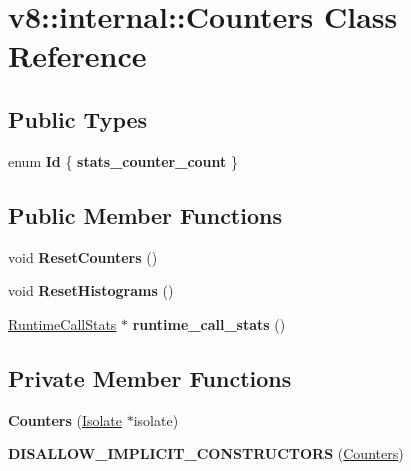 \hypertarget{classv8_1_1internal_1_1_counters}{}\section{v8\+:\+:internal\+:\+:Counters Class Reference}
\label{classv8_1_1internal_1_1_counters}
\subsection*{Public Types}
\begin{DoxyCompactItemize}
\item 
enum {\bfseries Id} \{ {\bfseries stats\+\_\+counter\+\_\+count}
 \}\hypertarget{classv8_1_1internal_1_1_counters_a77f5e90ac882f961ab168d691da5057c}{}\label{classv8_1_1internal_1_1_counters_a77f5e90ac882f961ab168d691da5057c}

\end{DoxyCompactItemize}
\subsection*{Public Member Functions}
\begin{DoxyCompactItemize}
\item 
void {\bfseries Reset\+Counters} ()\hypertarget{classv8_1_1internal_1_1_counters_acb6463bd09a4e95031ab7c601803403e}{}\label{classv8_1_1internal_1_1_counters_acb6463bd09a4e95031ab7c601803403e}

\item 
void {\bfseries Reset\+Histograms} ()\hypertarget{classv8_1_1internal_1_1_counters_ac8b9a827af33b6e3b284c9111b53b3f8}{}\label{classv8_1_1internal_1_1_counters_ac8b9a827af33b6e3b284c9111b53b3f8}

\item 
\hyperlink{structv8_1_1internal_1_1_runtime_call_stats}{Runtime\+Call\+Stats} $\ast$ {\bfseries runtime\+\_\+call\+\_\+stats} ()\hypertarget{classv8_1_1internal_1_1_counters_aa27049ebe05a1e1a0df0d0a03f679b9d}{}\label{classv8_1_1internal_1_1_counters_aa27049ebe05a1e1a0df0d0a03f679b9d}

\end{DoxyCompactItemize}
\subsection*{Private Member Functions}
\begin{DoxyCompactItemize}
\item 
{\bfseries Counters} (\hyperlink{classv8_1_1internal_1_1_isolate}{Isolate} $\ast$isolate)\hypertarget{classv8_1_1internal_1_1_counters_aca23c145a8573652dfffeb173824a62f}{}\label{classv8_1_1internal_1_1_counters_aca23c145a8573652dfffeb173824a62f}

\item 
{\bfseries D\+I\+S\+A\+L\+L\+O\+W\+\_\+\+I\+M\+P\+L\+I\+C\+I\+T\+\_\+\+C\+O\+N\+S\+T\+R\+U\+C\+T\+O\+RS} (\hyperlink{classv8_1_1internal_1_1_counters}{Counters})\hypertarget{classv8_1_1internal_1_1_counters_a00a045f9fb3fc592d8e14f05bb576677}{}\label{classv8_1_1internal_1_1_counters_a00a045f9fb3fc592d8e14f05bb576677}

\end{DoxyCompactItemize}
